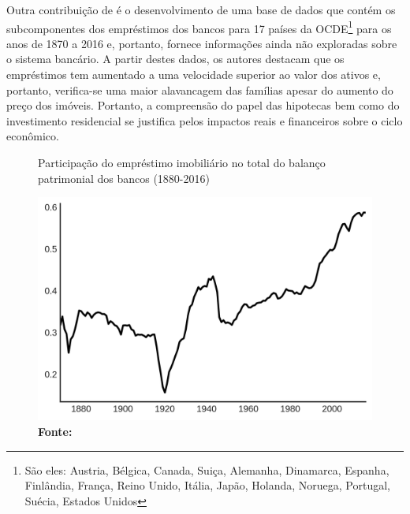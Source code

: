 Outra contribuição de \citeauthor*{jorda_great_2014} é o desenvolvimento de uma base de dados que contém os subcomponentes dos empréstimos dos bancos para 17 países da OCDE\footnote{São eles: Austria, Bélgica, Canada, Suiça, Alemanha, Dinamarca, Espanha, Finlândia, França, Reino Unido, Itália, Japão, Holanda, Noruega, Portugal, Suécia, Estados Unidos} para os anos de 1870 a 2016 e, portanto, fornece informações ainda não exploradas sobre o sistema bancário. A partir destes dados, os autores destacam que os empréstimos tem aumentado a uma velocidade superior ao valor dos ativos e, portanto, verifica-se uma maior alavancagem das famílias apesar do aumento do preço dos imóveis. Portanto, a compreensão do papel das hipotecas bem como do investimento residencial se justifica pelos impactos reais e financeiros sobre o ciclo econômico.



\begin{figure}
	\centering
	\caption{Participação do empréstimo imobiliário no total do balanço patrimonial dos bancos (1880-2016)}
	\label{GraficoJorda}
	\includegraphics{Jorda_Mean.png}
	\caption*{\textbf{Fonte:} \textcite[p.~10]{jorda_great_2014}}
\end{figure}

